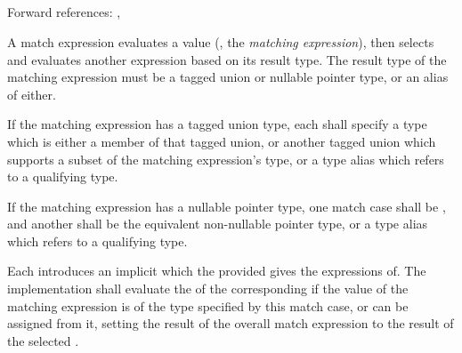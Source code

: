 
\begin{grammar}
 \\
	 \terminal{(}  \terminal{)} \terminal{\{}  \terminal{\}} \\

 \\
	  \\

 \\
	   \terminal{:}  \terminal{=>}  \\
	  \terminal{(}  \terminal{)} \terminal{:}  \terminal{=>}  \\
	  \terminal{=>}  \\
	 \terminal{=>}  \\
\end{grammar}

Forward references: , 

\specsubsubitem
A match expression evaluates a value (, the
\textit{matching expression}), then selects and evaluates another expression
based on its result type. The result type of the matching expression must be a
tagged union or nullable pointer type, or an alias of either.

\specsubsubitem
If the matching expression has a tagged union type, each
 shall specify a type which is either a member of that
tagged union, or another tagged union which supports a subset of the matching
expression's type, or a type alias which refers to a qualifying type.

\specsubsubitem
If the matching expression has a nullable pointer type, one match case shall be
, and another shall be the equivalent non-nullable pointer type,
or a type alias which refers to a qualifying type.

\specsubsubitem
Each  introduces an implicit
 which the provided
 gives the expressions of. The implementation
shall evaluate the  of the corresponding
 if the value of the matching expression is of the type
specified by this match case, or can be assigned from it, setting the result of
the overall match expression to the result of the selected
.

